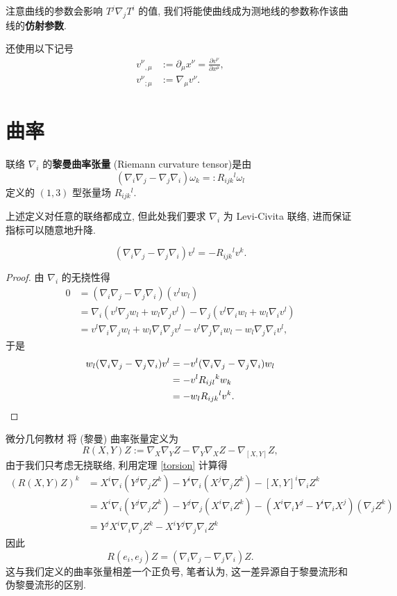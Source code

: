 注意曲线的参数会影响 $T^j\nabla_jT^i$ 的值, 我们将能使曲线成为测地线的参数称作该曲线的{\bf 仿射参数}.


\begin{remark}
	还使用以下记号
	\begin{align*}
		v^\nu{}_{,\mu} &:= \partial_\mu x^\nu=\frac{\partial v^\nu}{\partial x^\mu},\\
		v^\nu{}_{;\mu} &:= \nabla_\mu v^\nu.
	\end{align*}
\end{remark}

\section{曲率}
\begin{proposition}[黎曼曲率张量]
	联络 $\nabla_i$ 的{\bf 黎曼曲率张量} (Riemann curvature tensor)是由
	\[ (\nabla_i\nabla_j-\nabla_j\nabla_i)\omega_k=:R_{ijk}{}^{l} \omega_l \] 
	定义的 $(1,3)$ 型张量场 $R_{ijk}{}^{l}$.
\end{proposition}
\begin{remark}
	上述定义对任意的联络都成立, 但此处我们要求 $\nabla_i$ 为 Levi-Civita 联络, 进而保证指标可以随意地升降.
\end{remark}
\begin{theorem}\keepline
	\[ (\nabla_i\nabla_j-\nabla_j\nabla_i)v^l=-R_{ijk}{}^{l}v^k. \] 
\end{theorem}
\begin{proof}
	由 $\nabla_i$ 的无挠性得
	\begin{align*}
		0 &= (\nabla_i\nabla_j-\nabla_j\nabla_i)(v^lw_l)\\
		&= \nabla_i(v^l\nabla_j w_l+w_l\nabla_j v^l)-\nabla_j(v^l\nabla_i w_l+w_l\nabla_i v^l)\\
		&= v^l\nabla_i\nabla_j w_l+w_l\nabla_i\nabla_j v^l-v^l\nabla_j\nabla_i w_l-w_l\nabla_j\nabla_i v^l,
	\end{align*}
	于是
	\begin{align*}
		w_l(\nabla_i\nabla_j-\nabla_j\nabla_i)v^l&=-v^l(\nabla_i\nabla_j-\nabla_j\nabla_i)w_l\\
		&=-v^lR_{ijl}{}^{k}w_k\\
		&=-w_lR_{ijk}{}^{l}v^k.\qedhere
	\end{align*}
\end{proof}
\begin{remark}
	微分几何教材 \cite{陈维桓2013微分几何引论} 将 (黎曼) 曲率张量定义为
	\[ R(X,Y)Z:=\nabla_X\nabla_Y Z-\nabla_Y\nabla_X Z-\nabla_{[X,Y]}Z, \] 
	由于我们只考虑无挠联络, 利用定理 \ref{torsion} 计算得
	\begin{align*}
		(R(X,Y)Z)^k &= X^i\nabla_i (Y^j\nabla_j Z^k)-Y^i\nabla_i(X^j\nabla_j Z^k)-[X,Y]^i\nabla_i Z^k\\
		&=X^i\nabla_i (Y^j\nabla_j Z^k)-Y^j\nabla_j(X^i\nabla_i Z^k)-(X^i\nabla_i Y^j-Y^i\nabla_i X^j)(\nabla_j Z^k)\\
		&=Y^jX^i\nabla_i\nabla_j Z^k-X^iY^j\nabla_j\nabla_i Z^k
	\end{align*}
	因此
	\[ R(e_i,e_j)Z=(\nabla_i\nabla_j-\nabla_j\nabla_i)Z. \]
	这与我们定义的曲率张量相差一个正负号, 笔者认为, 这一差异源自于黎曼流形和伪黎曼流形的区别.
\end{remark}
